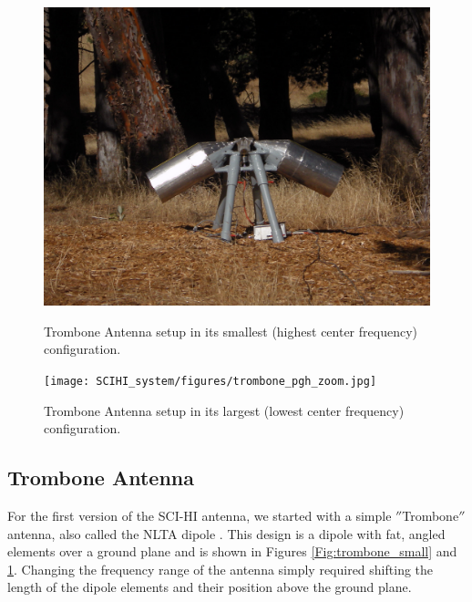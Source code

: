 \begin{figure}[htb]
\centering
\begin{minipage}[b]{0.45\textwidth}
\centering
\includegraphics[width=0.95\linewidth]{SCIHI_system/figures/trombone_guad_small.jpg}
\caption{Trombone Antenna setup in its smallest (highest center frequency) configuration.}
\label{Fig:trombone_small}
\end{minipage}%
\begin{minipage}[b]{0.02\textwidth}
\hspace{1cm}
\end{minipage}%
\begin{minipage}[b]{0.51\textwidth}
\centering
\texttt{[image: SCIHI\_system/figures/trombone\_pgh\_zoom.jpg]}
\caption{Trombone Antenna setup in its largest (lowest center frequency) configuration.}
\label{Fig:trombone_large}
\end{minipage}
\end{figure}

\subsection{Trombone Antenna}
For the first version of the SCI-HI antenna, we started with a simple $''$Trombone$''$ antenna, also called the NLTA dipole \cite{ellingson_2005}. This design is a dipole with fat, angled elements over a ground plane and is shown in Figures \ref{Fig:trombone_small} and \ref{Fig:trombone_large}. Changing the frequency range of the antenna simply required shifting the length of the dipole elements and their position above the ground plane. 

